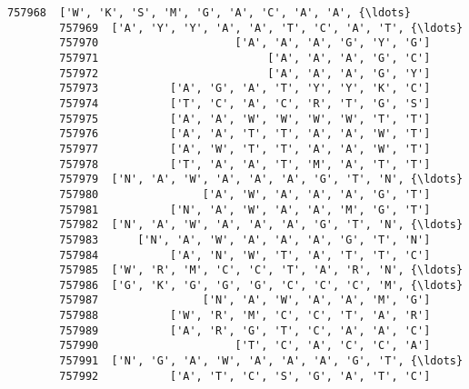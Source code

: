 \documentclass[11pt]{article}
\begin{document}
\begin{Verbatim}[commandchars=\\\{\}]
        757968  ['W', 'K', 'S', 'M', 'G', 'A', 'C', 'A', 'A', {\ldots}   
        757969  ['A', 'Y', 'Y', 'A', 'A', 'T', 'C', 'A', 'T', {\ldots}   
        757970                     ['A', 'A', 'A', 'G', 'Y', 'G']   
        757971                          ['A', 'A', 'A', 'G', 'C']   
        757972                          ['A', 'A', 'A', 'G', 'Y']   
        757973           ['A', 'G', 'A', 'T', 'Y', 'Y', 'K', 'C']   
        757974           ['T', 'C', 'A', 'C', 'R', 'T', 'G', 'S']   
        757975           ['A', 'A', 'W', 'W', 'W', 'W', 'T', 'T']   
        757976           ['A', 'A', 'T', 'T', 'A', 'A', 'W', 'T']   
        757977           ['A', 'W', 'T', 'T', 'A', 'A', 'W', 'T']   
        757978           ['T', 'A', 'A', 'T', 'M', 'A', 'T', 'T']   
        757979  ['N', 'A', 'W', 'A', 'A', 'A', 'G', 'T', 'N', {\ldots}   
        757980                ['A', 'W', 'A', 'A', 'A', 'G', 'T']   
        757981           ['N', 'A', 'W', 'A', 'A', 'M', 'G', 'T']   
        757982  ['N', 'A', 'W', 'A', 'A', 'A', 'G', 'T', 'N', {\ldots}   
        757983      ['N', 'A', 'W', 'A', 'A', 'A', 'G', 'T', 'N']   
        757984           ['A', 'N', 'W', 'T', 'A', 'T', 'T', 'C']   
        757985  ['W', 'R', 'M', 'C', 'C', 'T', 'A', 'R', 'N', {\ldots}   
        757986  ['G', 'K', 'G', 'G', 'G', 'C', 'C', 'C', 'M', {\ldots}   
        757987                ['N', 'A', 'W', 'A', 'A', 'M', 'G']   
        757988           ['W', 'R', 'M', 'C', 'C', 'T', 'A', 'R']   
        757989           ['A', 'R', 'G', 'T', 'C', 'A', 'A', 'C']   
        757990                     ['T', 'C', 'A', 'C', 'C', 'A']   
        757991  ['N', 'G', 'A', 'W', 'A', 'A', 'A', 'G', 'T', {\ldots}   
        757992           ['A', 'T', 'C', 'S', 'G', 'A', 'T', 'C']   
        

\end{Verbatim}
\end{document}
